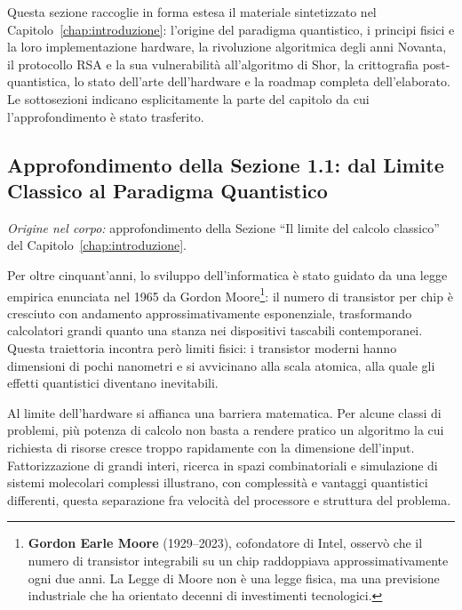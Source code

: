 \begin{onehalfspace}

Questa sezione raccoglie in forma estesa il materiale sintetizzato nel Capitolo~\ref{chap:introduzione}: l'origine del paradigma quantistico, i principi fisici e la loro implementazione hardware, la rivoluzione algoritmica degli anni Novanta, il protocollo RSA e la sua vulnerabilità all'algoritmo di Shor, la crittografia post-quantistica, lo stato dell'arte dell'hardware e la roadmap completa dell'elaborato. Le sottosezioni indicano esplicitamente la parte del capitolo da cui l'approfondimento è stato trasferito.

\subsection{Approfondimento della Sezione 1.1: dal Limite Classico al Paradigma Quantistico}
\label{app:intro:origini}

\noindent\textit{Origine nel corpo:} approfondimento della Sezione ``Il limite del calcolo classico'' del Capitolo~\ref{chap:introduzione}.

Per oltre cinquant'anni, lo sviluppo dell'informatica è stato guidato da una legge empirica enunciata nel 1965 da Gordon Moore\footnote{\textbf{Gordon Earle Moore} (1929--2023), cofondatore di Intel, osservò che il numero di transistor integrabili su un chip raddoppiava approssimativamente ogni due anni. La Legge di Moore non è una legge fisica, ma una previsione industriale che ha orientato decenni di investimenti tecnologici.}: il numero di transistor per chip è cresciuto con andamento approssimativamente esponenziale, trasformando calcolatori grandi quanto una stanza nei dispositivi tascabili contemporanei. Questa traiettoria incontra però limiti fisici: i transistor moderni hanno dimensioni di pochi nanometri e si avvicinano alla scala atomica, alla quale gli effetti quantistici diventano inevitabili.

Al limite dell'hardware si affianca una barriera matematica. Per alcune classi di problemi, più potenza di calcolo non basta a rendere pratico un algoritmo la cui richiesta di risorse cresce troppo rapidamente con la dimensione dell'input. Fattorizzazione di grandi interi, ricerca in spazi combinatoriali e simulazione di sistemi molecolari complessi illustrano, con complessità e vantaggi quantistici differenti, questa separazione fra velocità del processore e struttura del problema.


\end{onehalfspace}

